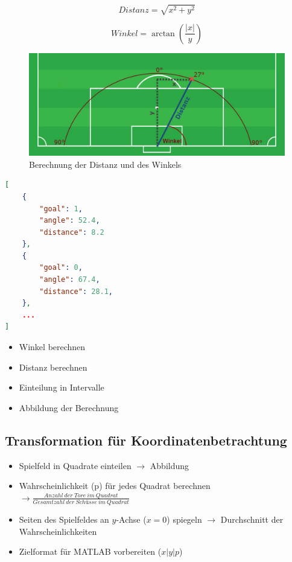 \begin{equation}
Distanz= \sqrt{x^2 + y^2}
\end{equation}

\begin{equation}
Winkel= \arctan(\frac{|x|}{y})
\end{equation}


\begin{figure}[H]
\centering
\includegraphics[scale=0.425]{se-wa-jpg/winkel_distanz}
\caption[Berechnung der Distanz und des Winkels]{Berechnung der Distanz und des Winkels}
\label{transf_pitch}
\end{figure}

\begin{lstlisting}[caption=\captionListingText,language=json,xleftmargin=5mm,label=wdData] 
[
	{
		"goal": 1,
		"angle": 52.4,
		"distance": 8.2
	},
	{
		"goal": 0,
		"angle": 67.4,
		"distance": 28.1,
	},
	...
]
\end{lstlisting}

\begin{itemize}
\item Winkel berechnen
\item Distanz berechnen
\item Einteilung in Intervalle
\item Abbildung der Berechnung
\end{itemize}


\subsection{Transformation für Koordinatenbetrachtung}
\label{kt}
\begin{itemize}
\item Spielfeld in Quadrate einteilen $\rightarrow$ Abbildung
\item Wahrscheinlichkeit (p) für jedes Quadrat berechnen $\rightarrow \frac{Anzahl~der~Tore~im~Quadrat}{Gesamtzahl~der~Schüsse~im~Quadrat}$ 
\item Seiten des Spielfeldes an $y$-Achse ($x=0$) spiegeln $\rightarrow$ Durchschnitt der Wahrscheinlichkeiten
\item Zielformat für MATLAB vorbereiten ($x|y|p$)
\end{itemize}

